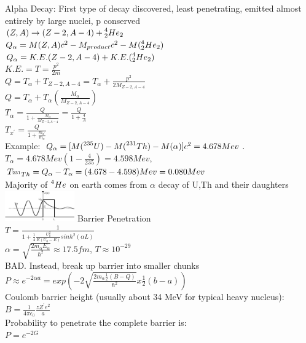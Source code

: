 \documentclass{article}
\begin{document}
\begin{multicols}{3}
Alpha Decay: First type of decay discovered, least penetrating, emitted almost entirely by large nuclei, p conserved\\
 $(Z,A)\rightarrow(Z-2,A-4) + \prescript{4}{2}{He}_{2}$\\
 $Q_{\alpha} = M(Z,A)c^{2} - M_{product}c^{2} - M(\prescript{4}{2}{He}_{2})$\\
 $Q_{\alpha} = K.E.(Z-2,A-4) + K.E.(\prescript{4}{2}{He}_{2})$\\
 $K.E. = T = \frac{p^{2}}{2m}$\\
 $Q = T_{\alpha} + T_{Z-2,A-4} = T_{\alpha} + \frac{p^2}{2M_{Z-2,A-4}}$\\
 $Q = T_{\alpha} + T_{\alpha}(\frac{M_{\alpha}}{M_{Z-2,A-4}})$\\
 $T_{\alpha} = \frac{Q}{1 + \frac{M_{\alpha}}{M_{Z-2,A-4}}} = \frac{Q}{1 + \frac{4}{A}}$\\
 $T_{x^{\prime}} = \frac{Q}{1 + \frac{m_{x^{\prime}}}{m_{\alpha}}}$\\
Example: $Q_{\alpha} = [M(\prescript{235}{}{U}) - M(\prescript{231}{}{Th}) - M(\alpha)]c^{2} = 4.678 Mev$.  $T_{\alpha} = 4.678Mev(1-\frac{4}{235}) = 4.598 Mev$, $T_{\prescript{231}{}{Th}} = Q_{\alpha} - T_{\alpha} = (4.678 - 4.598)Mev = 0.080Mev$\\
Majority of $\prescript{4}{}{He}$ on earth comes from $\alpha$ decay of U,Th and their daughters\\
\includegraphics[width=3cm]{images/alpha_barrier.png} Barrier Penetration\\
$T = \frac{1}{1 + \frac{1}{4}\frac{U_{0}^{2}}{E(U_{0}-E)}sinh^{2}(\alpha L)}$\\
$\alpha = \sqrt{\frac{2m_{\alpha}E_{\alpha}}{\hbar^{2}}} \approx 17.5 fm$,  $T\approx10^{-29}$\\
BAD.  Instead, break up barrier into smaller chunks\\
$P \approx e^{-2\alpha a} = exp(-2\sqrt{\frac{2m_{\alpha}\frac{1}{2}(B-Q)}{\hbar^{2}}}x\frac{1}{2}(b-a))$\\
Coulomb barrier height (usually about 34 MeV for typical heavy nucleus):\\
$B = \frac{1}{4\pi \epsilon_{0}} \frac{zZ^{\prime}e^{2}}{a}$\\
Probability to penetrate the complete barrier is:\\
\hspace*{0.01\textwidth} $P = e^{-2G}$\\

\end{multicols}
\end{document}

